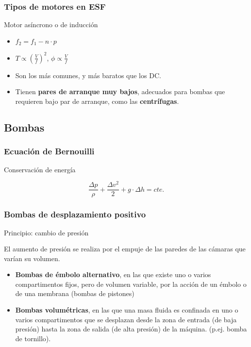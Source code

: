 \documentclass[serif, xcolor=dvipsnames]{beamer}
\begin{document}
\begin{frame}
\frametitle{Tipos de motores en ESF}
\begin{block}
{Motor asíncrono o de inducción}
\begin{itemize}
\item $f_{2}=f_{1}-n\cdot p$
\item $T\propto\left(\frac{V}{f}\right)^{2}$, $\phi\propto\frac{V}{f}$
\item Son los más comunes, y más baratos que los DC. 
\item Tienen \textbf{pares de arranque muy bajos}, adecuados para bombas
que requieren bajo par de arranque, como las \textbf{centrífugas}.
\end{itemize}
\end{block}

\end{frame}

\subsection{Bombas}


\begin{frame}
\frametitle{Ecuación de Bernouilli}
\begin{block}
{Conservación de energía}

\[
\frac{\Delta p}{\rho}+\frac{\Delta v^2}{2}+g\cdot\Delta h=cte.\]


\end{block}

\end{frame}

\begin{frame}
\frametitle{Bombas de desplazamiento positivo}
\begin{block}
{Principio: cambio de presión} 

El aumento de presión se realiza por el empuje de las paredes de las
cámaras que varían su volumen. 
\begin{itemize}
\item \textbf{Bombas de émbolo alternativo}, en las que existe uno o varios
compartimentos fijos, pero de volumen variable, por la acción de un
émbolo o de una membrana (bombas de pistones)
\item \textbf{Bombas volumétricas}, en las que una masa fluida es confinada
en uno o varios compartimentos que se desplazan desde la zona de entrada
(de baja presión) hasta la zona de salida (de alta presión) de la
máquina. (p.ej. bomba de tornillo). 
\end{itemize}
\end{block}

\end{frame}
\end{document}
